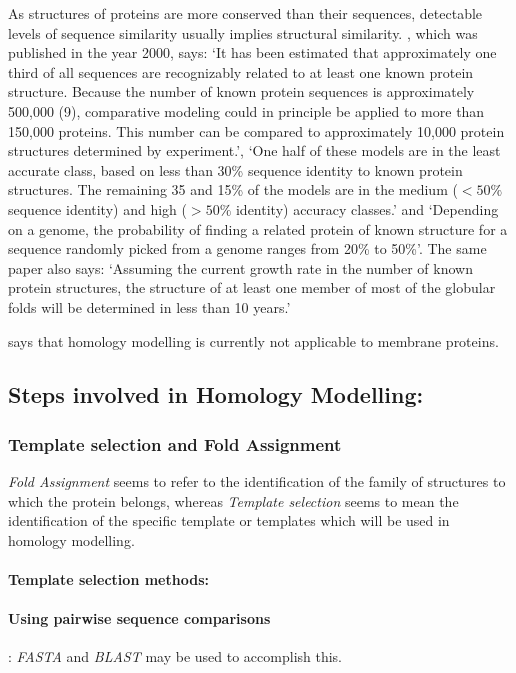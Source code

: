 \documentclass[10pt]{report}
\begin{document}
As structures of proteins are more conserved than their sequences, detectable levels of sequence similarity usually implies structural similarity. \cite{marti-renom2000com}, which was published in the year 2000, says: `It has been estimated that approximately one third of all sequences are recognizably related to at least one known protein structure. Because the number of known protein sequences is approximately 500,000 (9), comparative modeling could in principle be applied to more than 150,000 proteins. This number can be compared to approximately 10,000 protein structures determined by experiment.', `One half of these models are in the least accurate class, based on less than 30\% sequence identity to known protein structures. The remaining 35 and 15\% of the models are in the medium ($<50\%$ sequence identity) and high ($>50\%$ identity) accuracy classes.' and `Depending on a genome, the probability of finding a related protein of known structure for a sequence randomly picked from a genome ranges from 20\% to 50\%'. The same paper also says: `Assuming the current growth rate in the number of known protein structures, the structure of at least one member of most of the globular folds will be determined in less than 10 years.'

\cite{marti-renom2000com} says that homology modelling is currently not applicable to membrane proteins.

\subsection{Steps involved in Homology Modelling:}

\subsubsection{Template selection and Fold Assignment}

\textit{Fold Assignment} seems to refer to the identification of the family of structures to which the protein belongs, whereas \textit{Template selection} seems to mean the identification of the specific template or templates which will be used in homology modelling.

\paragraph{Template selection methods:}

\paragraph{Using pairwise sequence comparisons}: \textit{FASTA} and \textit{BLAST} may be used to accomplish this.
\end{document}
